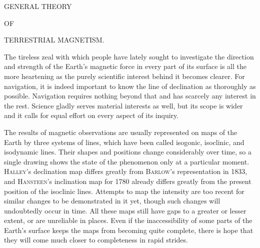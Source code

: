 \renewcommand{\Article}[1]{\par\medskip\Needspace{4\baselineskip}\pdfbookmark[1]{Art. #1}{erdmagnetismus-art-#1}\centerline{\textbf{#1.}}\nobreak\smallskip}
\par\medskip
\centerline{GENERAL THEORY}
\centerline{OF}
\centerline{TERRESTRIAL MAGNETISM.}
\medskip
The tireless zeal with which people have lately sought to investigate the direction and strength of the Earth's magnetic force in every part of its surface is all the more heartening as the purely scientific interest behind it becomes clearer. For navigation, it is indeed important to know the line of declination as thoroughly as possible. Navigation requires nothing beyond that and has scarcely any interest in the rest. Science gladly serves material interests as well, but its scope is wider and it calls for equal effort on every aspect of its inquiry.

The results of magnetic observations are usually represented on maps of the Earth by three systems of lines, which have been called isogonic, isoclinic, and isodynamic lines. Their shapes and positions change considerably over time, so a single drawing shows the state of the phenomenon only at a particular moment. \textsc{Halley}'s declination map differs greatly from \textsc{Barlow}'s representation in 1833, and \textsc{Hansteen}'s inclination map for 1780 already differs greatly from the present position of the isoclinic lines. Attempts to map the intensity are too recent for similar changes to be demonstrated in it yet, though such changes will undoubtedly occur in time. All these maps still have gaps to a greater or lesser extent, or are unreliable in places. Even if the inaccessibility of some parts of the Earth's surface keeps the maps from becoming quite complete, there is hope that they will come much closer to completeness in rapid strides.

